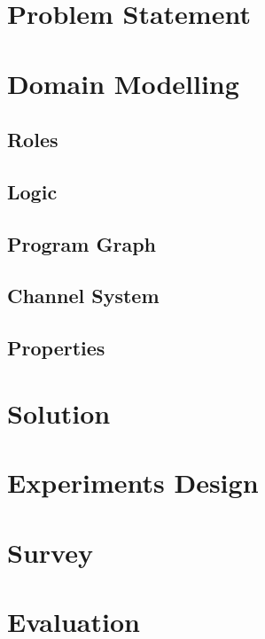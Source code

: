 \section {Problem Statement}
\label{sec:problem}


\section{Domain Modelling}
\label{sec:modelling}


\subsection{Roles}
\label{sec:roles}


\subsection{Logic}
\label{sec:logic}


\subsection{Program Graph}
\label{sec:pg}


\subsection{Channel System}
\label{sec:cs}


\subsection{Properties}
\label{sec:properties}


\section{Solution}
\label{sec:solution}


\section{Experiments Design}
\label{sec:experiment}


\section{Survey}
\label{sec:survey}


%


\section{Evaluation}%
\label{sec:validation}



%
